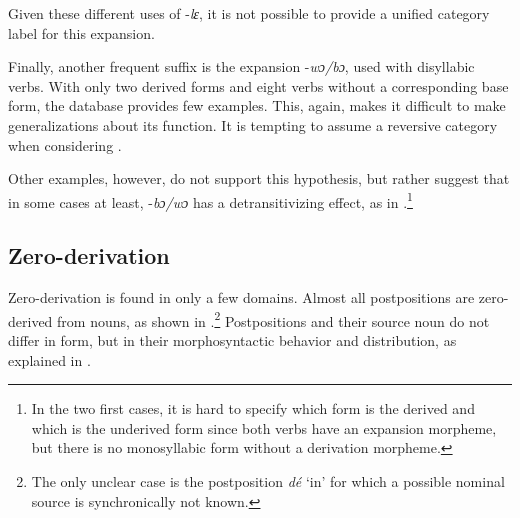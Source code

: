
Given these different uses of -{\itshape lɛ}, it is not possible to provide a unified category label for this expansion.




Finally, another frequent suffix is the expansion -{\itshape wɔ/bɔ}, used with disyllabic verbs. With only two derived forms and eight verbs without a corresponding base form, the database provides few examples. This, again, makes it difficult to make generalizations about its function. It is tempting to assume a reversive category when considering .



Other examples, however, do not support this hypothesis, but rather suggest that in some cases at least, -{\itshape bɔ/wɔ} has a detransitivizing effect, as in .\footnote{In the two first cases, it is hard to specify which form is the derived and which is the underived form since both verbs have an expansion morpheme, but there is no monosyllabic form without a derivation morpheme.}




\largerpage[2]
\subsection{Zero-derivation}
\label{sec:ZeroDer}

Zero-derivation is found in only a few domains.
Almost all postpositions are zero-derived from nouns, as shown in .\footnote{The only unclear case is the postposition {\itshape dé} `in' for which a possible nominal source is synchronically not known.} Postpositions and their source noun do not differ in form, but in their morphosyntactic behavior and distribution, as explained in .

